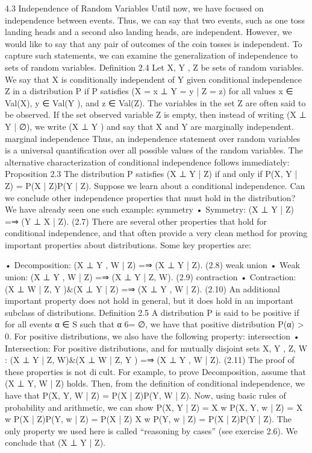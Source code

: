 4.3 Independence of Random Variables
Until now, we have focused on independence between events. Thus, we can say that two events, such as one toss landing heads and a second also landing heads, are independent. However, we would like to say that any pair of outcomes of the coin tosses is independent. To capture such statements, we can examine the generalization of independence to sets of random variables. Definition 2.4 Let X, Y , Z be sets of random variables. We say that X is conditionally independent of Y given conditional independence Z in a distribution P if P satisfies (X = x ⊥ Y = y | Z = z) for all values x ∈ Val(X), y ∈ Val(Y ), and z ∈ Val(Z). The variables in the set Z are often said to be observed. If the set observed variable Z is empty, then instead of writing (X ⊥ Y | ∅), we write (X ⊥ Y ) and say that X and Y are marginally independent. marginal independence Thus, an independence statement over random variables is a universal quantification over all possible values of the random variables. The alternative characterization of conditional independence follows immediately: Proposition 2.3 The distribution P satisfies (X ⊥ Y | Z) if and only if P(X, Y | Z) = P(X | Z)P(Y | Z). Suppose we learn about a conditional independence. Can we conclude other independence properties that must hold in the distribution? We have already seen one such example: symmetry • Symmetry: (X ⊥ Y | Z) =⇒ (Y ⊥ X | Z). (2.7) There are several other properties that hold for conditional independence, and that often provide a very clean method for proving important properties about distributions. Some key properties are:

• Decomposition: (X ⊥ Y , W | Z) =⇒ (X ⊥ Y | Z). (2.8) weak union • Weak union: (X ⊥ Y , W | Z) =⇒ (X ⊥ Y | Z, W). (2.9) contraction • Contraction: (X ⊥ W | Z, Y )&(X ⊥ Y | Z) =⇒ (X ⊥ Y , W | Z). (2.10) An additional important property does not hold in general, but it does hold in an important subclass of distributions. Definition 2.5 A distribution P is said to be positive if for all events α ∈ S such that α 6= ∅, we have that positive distribution P(α) > 0. For positive distributions, we also have the following property: intersection • Intersection: For positive distributions, and for mutually disjoint sets X, Y , Z, W : (X ⊥ Y | Z, W)&(X ⊥ W | Z, Y ) =⇒ (X ⊥ Y , W | Z). (2.11) The proof of these properties is not dicult. For example, to prove Decomposition, assume that (X ⊥ Y, W | Z) holds. Then, from the definition of conditional independence, we have that P(X, Y, W | Z) = P(X | Z)P(Y, W | Z). Now, using basic rules of probability and arithmetic, we can show P(X, Y | Z) = X w P(X, Y, w | Z) = X w P(X | Z)P(Y, w | Z) = P(X | Z) X w P(Y, w | Z) = P(X | Z)P(Y | Z). The only property we used here is called “reasoning by cases” (see exercise 2.6). We conclude that (X ⊥ Y | Z).

